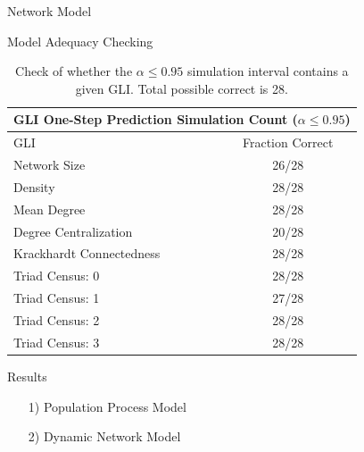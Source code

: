 \documentclass[10pt]{beamer}
\begin{document}



\begin{frame}{Network Model}
\begin{center}
\footnotesize{

}
\end{center}
\end{frame}


\begin{frame}{Model Adequacy Checking}
\begin{table}[ht]
\begin{center}
\begin{tabular}{l|c}
 \multicolumn{2}{c}{\textbf{GLI One-Step Prediction Simulation Count ($\alpha \leq 0.95$)}} \\
  \hline
GLI & Fraction Correct\\
  \hline
Network Size & 26/28 \\ 
  Density & 28/28 \\ 
  Mean Degree & 28/28 \\ 
  Degree Centralization & 20/28\\ 
  Krackhardt Connectedness & 28/28 \\ 
  Triad Census: 0 & 28/28 \\ 
  Triad Census: 1 & 27/28 \\ 
  Triad Census: 2 & 28/28 \\ 
  Triad Census: 3 & 28/28\\ 
   \hline
\end{tabular}
\caption{Check of whether the $\alpha \leq 0.95$ simulation interval contains a given GLI. Total possible correct is 28.}\label{tbl:count}
\end{center}
\end{table}
\end{frame}

\begin{frame}{}
\begin{block}{Results}
\begin{itemize}
\item[1)] Population Process Model
\item[2)] Dynamic Network Model
\end{itemize}
\end{block}

\end{frame}
\end{document}
